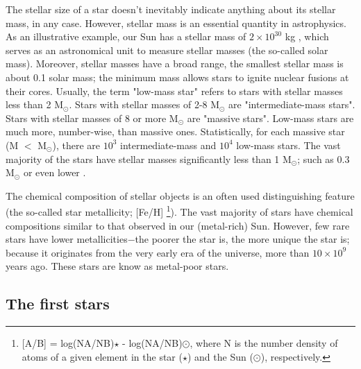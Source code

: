 The stellar size of a star doesn't inevitably indicate anything about its stellar mass, in any case. However, stellar mass is an essential quantity in astrophysics. As an illustrative example, our Sun has a stellar mass of $2 \times 10^{30}$ kg \citep[roughly $3 \times 10^{5}$ the mass of Earth,][]{2017EGUGA..1911131E, 2019arXiv190612272C}, which serves as an astronomical unit to measure stellar masses (the so-called solar mass). Moreover, stellar masses have a broad range, the smallest stellar mass is about 0.1 solar mass; the minimum mass allows stars to ignite nuclear fusions at their cores. Usually, the term "low-mass star" refers to stars with stellar masses less than 2 M$_{\odot}$. Stars with stellar masses of 2-8 M$_{\odot}$ are "intermediate-mass stars". Stars with stellar masses of 8 or more M$_{\odot}$  are "massive stars". Low-mass stars are much more, number-wise, than massive ones. Statistically, for each massive star (M $<$ M$_{\odot}$), there are $10^{3}$ intermediate-mass and $10^{4}$ low-mass stars. The vast majority of the stars have stellar masses significantly less than 1 M$_{\odot}$; such as 0.3 M$_{\odot}$ or even lower \citep{2019MNRAS.487.2937O}.



The chemical composition of stellar objects is an often used distinguishing feature (the so-called  star metallicity; [Fe/H] \footnote{[A/B] = log(NA/NB)$\star$ - log(NA/NB)$\odot$, where N is the number density of atoms of a given element in the star ($\star$) and the Sun ($\odot$), respectively.}). The vast majority of stars have chemical compositions similar to that observed in our (metal-rich) Sun. However, few rare stars have lower metallicities$-$the poorer the star is, the more unique the star is; because it originates from the very early era of the universe, more than $10 \times 10^{9}$ years ago. These stars are know as metal-poor stars.


\subsection{The first stars}


